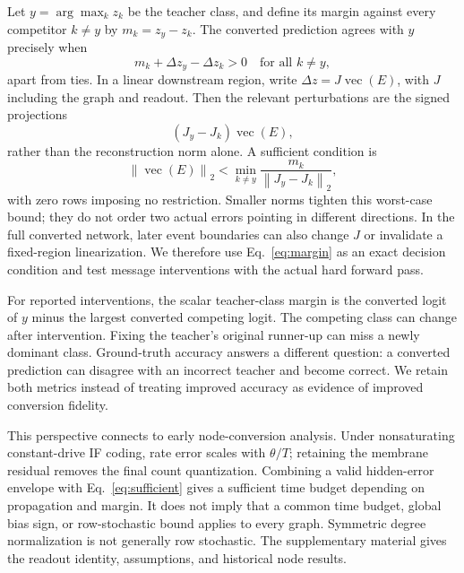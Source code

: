 \documentclass[10pt,twocolumn,letterpaper]{article}
\newcommand{\norm}[1]{\left\lVert#1\right\rVert}
\begin{document}
Let $y=\arg\max_k z_k$ be the teacher class, and define its margin against every competitor $k\ne y$ by $m_k=z_y-z_k$. The converted prediction agrees with $y$ precisely when
\begin{equation}
 m_k+\Delta z_y-\Delta z_k>0\quad\text{for all }k\ne y,
 \label{eq:margin}
\end{equation}
apart from ties. In a linear downstream region, write $\Delta z=J\operatorname{vec}(E)$, with $J$ including the graph and readout. Then the relevant perturbations are the signed projections
\begin{equation}
 (J_y-J_k)\operatorname{vec}(E),
\end{equation}
rather than the reconstruction norm alone. A sufficient condition is
\begin{equation}
 \norm{\operatorname{vec}(E)}_2<
 \min_{k\ne y}\frac{m_k}{\norm{J_y-J_k}_2},\label{eq:sufficient}
\end{equation}
with zero rows imposing no restriction. Smaller norms tighten this worst-case bound; they do not order two actual errors pointing in different directions. In the full converted network, later event boundaries can also change $J$ or invalidate a fixed-region linearization. We therefore use Eq.~\eqref{eq:margin} as an exact decision condition and test message interventions with the actual hard forward pass.

For reported interventions, the scalar teacher-class margin is the converted logit of $y$ minus the largest converted competing logit. The competing class can change after intervention. Fixing the teacher's original runner-up can miss a newly dominant class. Ground-truth accuracy answers a different question: a converted prediction can disagree with an incorrect teacher and become correct. We retain both metrics instead of treating improved accuracy as evidence of improved conversion fidelity.

This perspective connects to early node-conversion analysis. Under nonsaturating constant-drive IF coding, rate error scales with $\theta/T$; retaining the membrane residual removes the final count quantization. Combining a valid hidden-error envelope with Eq.~\eqref{eq:sufficient} gives a sufficient time budget depending on propagation and margin. It does not imply that a common time budget, global bias sign, or row-stochastic bound applies to every graph. Symmetric degree normalization is not generally row stochastic. The supplementary material gives the readout identity, assumptions, and historical node results.
\end{document}
